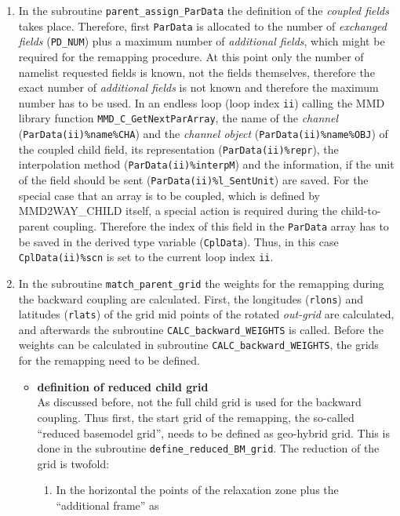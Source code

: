 \documentclass[11pt,twoside]{article}
\begin{document}
\begin{enumerate}
\item In the subroutine \verb|parent_assign_ParData| the definition of the 
{\it coupled fields} takes place. Therefore, first \verb|ParData| is allocated
to the number of {\it exchanged fields} (\verb|PD_NUM|) plus a maximum number of
{\it additional fields}, which might be required for the remapping procedure.
At this point only the number of namelist requested fields is known,
not the fields themselves, therefore the exact number of {\it
additional fields} is not known and therefore the maximum number has
to be used.  In an endless loop (loop index \verb|ii|) calling the MMD library
function  
\verb|MMD_C_GetNextParArray|, the name of the {\it channel} 
(\verb|ParData(ii)%name%CHA|) and the {\it
channel object} (\verb|ParData(ii)%name%OBJ|) of the coupled child 
field, its representation (\verb|ParData(ii)%repr|), the
interpolation method (\verb|ParData(ii)%interpM|) and the
information, if the unit of the field should be sent
(\verb|ParData(ii)%l_SentUnit|) are saved. 
For the special case that an array is to be coupled, which is defined by 
MMD2WAY\_CHILD itself, a special action is required during the 
child-to-parent coupling. Therefore the index of this field in the 
\verb|ParData| array  has to be saved in the derived type variable 
(\verb|CplData|). Thus, in this case  \verb|CplData(ii)%scn| is set to the 
current loop index \verb|ii|.
\item In the subroutine \verb|match_parent_grid| the weights for the
remapping during the backward coupling are calculated. 
First, the longitudes (\verb|rlons|) and latitudes (\verb|rlats|) of the grid
mid points of the rotated {\it out-grid} are calculated, and afterwards the
subroutine \verb|CALC_backward_WEIGHTS| is called. Before the weights can be
calculated in subroutine \verb|CALC_backward_WEIGHTS|, the grids for the
remapping need to be defined. 
\begin{itemize}
\item {\bf definition of reduced child grid}\\
As discussed before, not the full child grid is used for the backward
coupling. Thus first, the start grid of the remapping, the so-called
``reduced basemodel grid'', needs to be defined as geo-hybrid grid. This is
done in the subroutine 
\verb|define_reduced_BM_grid|. The reduction of the grid is twofold: 
\begin{enumerate}
\item  In the \label{page:addframe}
horizontal the points of the relaxation zone plus the ``additional frame'' as

\end{enumerate}
\end{itemize}
\end{enumerate}
\end{document}
